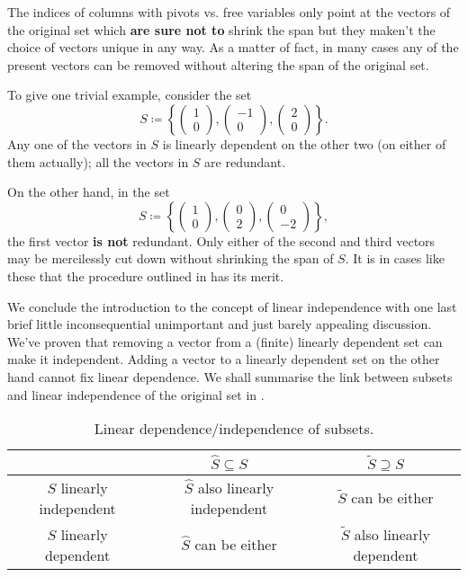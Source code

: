 \begin{warning}{}{}
 The indices of columns with pivots vs. free variables only point at the vectors
 of the original set which \textbf{are sure not to} shrink the span but they
 maken't the choice of vectors unique in any way. As a matter of fact, in many
 cases any of the present vectors can be removed without altering the span of
 the original set.

 To give one trivial example, consider the set
 \[
  S \coloneqq \left\{
   \begin{pmatrix}
    1\\0
   \end{pmatrix},
   \begin{pmatrix}
    -1\\
    0
   \end{pmatrix},
   \begin{pmatrix}
    2\\
    0
   \end{pmatrix}
  \right\}.
 \]
 Any one of the vectors in $S$ is linearly dependent on the other two (on either
 of them actually); all the vectors in $S$ are redundant.

 On the other hand, in the set
 \[
  S \coloneqq \left\{ 
   \begin{pmatrix}
    1\\
    0
   \end{pmatrix},
   \begin{pmatrix}
    0\\
    2
   \end{pmatrix},
   \begin{pmatrix}
    0\\
    -2
   \end{pmatrix}
  \right\},
 \]
 the first vector \textbf{is not} redundant. Only either of the second and third
 vectors may be mercilessly cut down without shrinking the span of $S$. It is in
 cases like these that the procedure outlined in
  has its merit.
\end{warning}

We conclude the introduction to the concept of linear independence with one last
brief little inconsequential unimportant and just barely appealing discussion.
We've proven that removing a vector from a (finite) linearly dependent set can
make it independent. Adding a vector to a linearly dependent set on the other
hand cannot fix linear dependence. We shall summarise the link between subsets
and linear independence of the original set in
.
\begin{table}[ht]
 \centering
 \begin{tabular}{c | c  c}
  & $\hat{S} \subseteq S$ & $\tilde{S} \supseteq S$ \\
  \toprule
  $S$ linearly independent & $\hat{S}$ also linearly independent & $\tilde{S}$
  can be either\\
  $S$ linearly dependent & $\hat{S}$ can be either & $\tilde{S}$ also linearly
  dependent 
 \end{tabular}
 \caption{Linear dependence/independence of subsets.}
 \label{table:linear-dependence-subsets}
\end{table}


